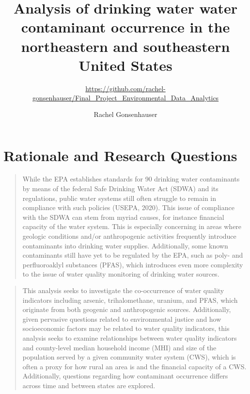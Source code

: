 \documentclass[12pt,]{article}
\title{Analysis of drinking water water contaminant occurrence in the
northeastern and southeastern United States}
\subtitle{\url{https://github.com/rachel-gonsenhauser/Final_Project_Environmental_Data_Analytics}}
\author{Rachel Gonsenhauser}
\date{}
\begin{document}
\maketitle

\newpage
\abstract

\begin{quote}
\end{quote}

\newpage
\tableofcontents 
\newpage
\listoftables 
\newpage
\listoffigures 
\newpage

\hypertarget{rationale-and-research-questions}{%
\section{Rationale and Research
Questions}\label{rationale-and-research-questions}}

\begin{quote}
While the EPA establishes standards for 90 drinking water contaminants
by means of the federal Safe Drinking Water Act (SDWA) and its
regulations, public water systems still often struggle to remain in
compliance with such policies (USEPA, 2020). This issue of compliance
with the SDWA can stem from myriad causes, for instance financial
capacity of the water system. This is especially concerning in areas
where geologic conditions and/or anthropogenic activities frequently
introduce contaminants into drinking water supplies. Additionally, some
known contaminants still have yet to be regulated by the EPA, such as
poly- and perfluoroaklyl substances (PFAS), which introduces even more
complexity to the issue of water quality monitoring of drinking water
sources.
\end{quote}

\begin{quote}
This analysis seeks to investigate the co-occurrence of water quality
indicators including arsenic, trihalomethane, uranium, and PFAS, which
originate from both geogenic and anthropogenic sources. Additionally,
given pervasive questions related to environmental justice and how
socioeconomic factors may be related to water quality indicators, this
analysis seeks to examine relationships between water quality indicators
and county-level median household income (MHI) and size of the
population served by a given community water system (CWS), which is
often a proxy for how rural an area is and the financial capacity of a
CWS. Additionally, questions regarding how contaminant occurrence
differs across time and between states are explored.
\end{quote}
\end{document}
